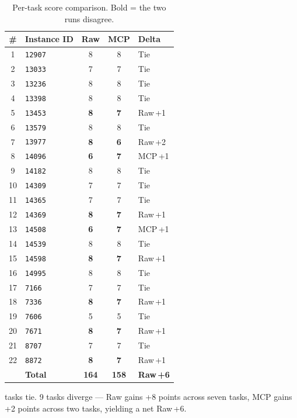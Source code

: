 \begin{table}[h]
\centering
\small
\caption{Per-task score comparison.  Bold = the two runs disagree.}\label{tab:h2h-sonnet}
\setlength{\tabcolsep}{3.5pt}
\begin{tabular}{clccl}
\toprule
\textbf{\#} & \textbf{Instance ID} & \textbf{Raw} & \textbf{MCP} & \textbf{Delta} \\
\midrule
 1 & \texttt{12907}  & 8 & 8 & Tie \\
 2 & \texttt{13033}  & 7 & 7 & Tie \\
 3 & \texttt{13236}  & 8 & 8 & Tie \\
 4 & \texttt{13398}  & 8 & 8 & Tie \\
 5 & \texttt{13453}  & \textbf{8} & \textbf{7} & Raw\,+1 \\
 6 & \texttt{13579}  & 8 & 8 & Tie \\
 7 & \texttt{13977}  & \textbf{8} & \textbf{6} & Raw\,+2 \\
 8 & \texttt{14096}  & \textbf{6} & \textbf{7} & MCP\,+1 \\
 9 & \texttt{14182}  & 8 & 8 & Tie \\
10 & \texttt{14309}  & 7 & 7 & Tie \\
11 & \texttt{14365}  & 7 & 7 & Tie \\
12 & \texttt{14369}  & \textbf{8} & \textbf{7} & Raw\,+1 \\
13 & \texttt{14508}  & \textbf{6} & \textbf{7} & MCP\,+1 \\
14 & \texttt{14539}  & 8 & 8 & Tie \\
15 & \texttt{14598}  & \textbf{8} & \textbf{7} & Raw\,+1 \\
16 & \texttt{14995}  & 8 & 8 & Tie \\
17 & \texttt{7166}   & 7 & 7 & Tie \\
18 & \texttt{7336}   & \textbf{8} & \textbf{7} & Raw\,+1 \\
19 & \texttt{7606}   & 5 & 5 & Tie \\
20 & \texttt{7671}   & \textbf{8} & \textbf{7} & Raw\,+1 \\
21 & \texttt{8707}   & 7 & 7 & Tie \\
22 & \texttt{8872}   & \textbf{8} & \textbf{7} & Raw\,+1 \\
\midrule
   & \textbf{Total}  & \textbf{164} & \textbf{158} & \textbf{Raw\,+6} \\
\bottomrule
\end{tabular}
\end{table}

 tasks tie.
9 tasks diverge --- Raw gains +8 points across seven tasks,
MCP gains +2 points across two tasks, yielding a net Raw\,+6.


